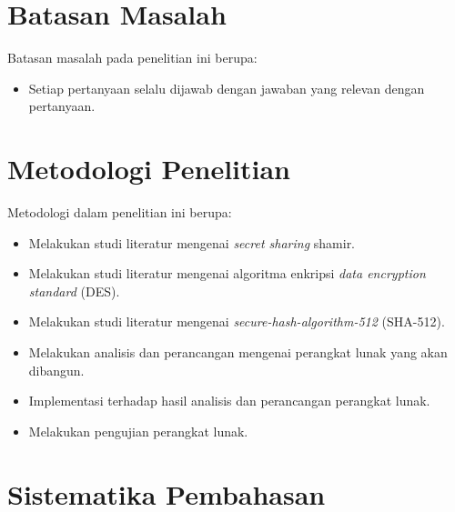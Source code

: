 \section{\textbf{Batasan Masalah}}
\label{sec:batasan masalah}

Batasan masalah pada penelitian ini berupa:
\begin{itemize}
	\item Setiap pertanyaan selalu dijawab dengan jawaban yang relevan dengan pertanyaan.
\end{itemize}

\section{\textbf{Metodologi Penelitian}}
\label{sec:metodologi penelitian}

Metodologi dalam penelitian ini berupa:
\begin{itemize}
	\item Melakukan studi literatur mengenai {\it secret sharing} shamir.
	\item Melakukan studi literatur mengenai algoritma enkripsi \textit{data encryption standard} (DES).
	\item Melakukan studi literatur mengenai \textit{secure-hash-algorithm-512} (SHA-512).
	\item Melakukan analisis dan perancangan mengenai perangkat lunak yang akan dibangun.
	\item Implementasi terhadap hasil analisis dan perancangan perangkat lunak.
	\item Melakukan pengujian perangkat lunak.
\end{itemize}

\section{\textbf{Sistematika Pembahasan}}
\label{sec:sistematika pembahasan}

